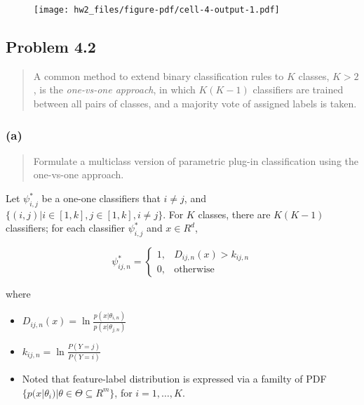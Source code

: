 \documentclass[
  letterpaper,
  DIV=11,
  numbers=noendperiod]{scrartcl}
\providecommand{\tightlist}{%
  \setlength{\itemsep}{0pt}\setlength{\parskip}{0pt}}\usepackage{longtable,booktabs,array}
\begin{document}
\begin{figure}[H]

{\centering \texttt{[image: hw2\_files/figure-pdf/cell-4-output-1.pdf]}

}

\end{figure}

\hypertarget{problem-4.2}{%
\subsection{Problem 4.2}\label{problem-4.2}}

\begin{quote}
A common method to extend binary classification rules to \(K\) classes,
\(K>2\), is the \emph{one-vs-one approach}, in which \(K(K-1)\)
classifiers are trained between all pairs of classes, and a majority
vote of assigned labels is taken.
\end{quote}

\hypertarget{sec-42a}{%
\subsubsection{(a)}\label{sec-42a}}

\begin{quote}
Formulate a multiclass version of parametric plug-in classification
using the one-vs-one approach.
\end{quote}

Let \(\psi^{*}_{i,j}\) be a one-one classifiers that \(i\neq j\), and
\(\{(i,j)| i\in [1,k], j \in [1,k], i\neq j\}\). For \(K\) classes,
there are \(K(K-1)\) classifiers; for each classifier \(\psi^{*}_{i,j}\)
and \(x\in R^d\),

\begin{equation}
    \psi^{*}_{ij,n} = 
    \begin{cases}
        1, & D_{ij, n}(x) > k_{ij,n}\\ 
        0, & \text{otherwise}
    \end{cases}
\end{equation}

where

\begin{itemize}
\tightlist
\item
  \(D_{ij,n}(x) = \ln \frac{p(x|\theta_{i,n})}{p(x|\theta_{j,n})}\)
\item
  \(k_{ij,n} = \ln\frac{P(Y=j)}{P(Y=i)}\)
\item
  Noted that feature-label distribution is expressed via a familty of
  PDF \(\{p(x|\theta_i) | \theta \in \Theta \subseteq R^m\}\), for
  \(i=1,\dots,K\).
\end{itemize}
\end{document}
